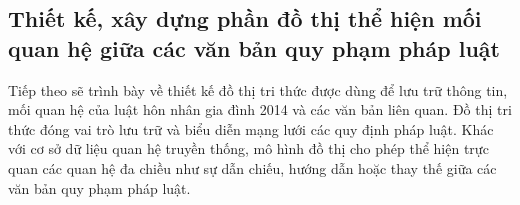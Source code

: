 \documentclass[../DoAn.tex]{subfiles}
\begin{document}



\subsection{Thiết kế, xây dựng phần đồ thị thể hiện mối quan hệ giữa các văn bản quy phạm pháp luật}
Tiếp theo sẽ trình bày về thiết kế đồ thị tri thức được dùng để lưu trữ thông tin, mối quan hệ của luật hôn nhân gia đình 2014 và các văn bản liên quan.
Đồ thị tri thức đóng vai trò lưu trữ và biểu diễn mạng lưới các quy định pháp luật. Khác với cơ sở dữ liệu quan hệ truyền thống, mô hình đồ thị cho phép thể hiện trực quan các quan hệ đa chiều như sự dẫn chiếu, hướng dẫn hoặc thay thế giữa các văn bản quy phạm pháp luật.
\end{document}
